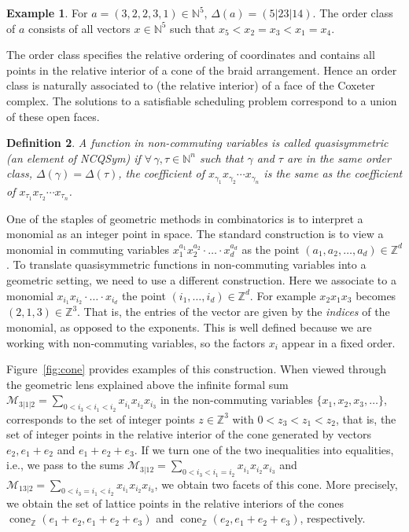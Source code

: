 \documentclass[12pt,reqno]{amsart}
\newtheorem{definition}{Definition}
\numberwithin{definition}{section}
\theoremstyle{definition}
\newtheorem{example}[definition]{Example}
\newcommand{\ZZ}{\mathbb{Z}}
\newcommand{\cone}{\operatorname{cone}}
\newcommand{\ncM}{\mathcal{M}}
\begin{document}
\begin{example}
For $a = (3,2,2,3,1) \in \mathbb{N}^5$, $\Delta(a) =
(5|23|14)$.  The order class of $a$ consists of all vectors $x
\in \mathbb{N}^5$ such that $x_5 < x_2 = x_3 < x_1 = x_4$. 
\end{example}


The order class specifies the relative ordering of coordinates and contains all points in the relative interior of a cone
of the braid arrangement.  Hence an order class is naturally associated to (the relative interior) of a face of
the Coxeter complex.  
The solutions to a satisfiable scheduling problem correspond to a union of these open faces.   


\begin{definition}
A function in non-commuting variables is called quasisymmetric (an element of NCQSym) if
$\forall \, \gamma, \tau \in \mathbb{N}^n$ such that $\gamma$ and $\tau$
are in the same order class, $\Delta(\gamma) =
\Delta(\tau)$, the coefficient of $x_{\gamma_1}x_{\gamma_2} \cdots
x_{\gamma_n}$ is the same as the coefficient of $x_{\tau_1}x_{\tau_2} \cdots x_{\tau_n}$.
\end{definition}
 One of the staples of geometric methods in combinatorics is to
 interpret a monomial as an integer point in space. The standard
 construction is to view a monomial in commuting variables
 $x_1^{a_1}x_2^{a_2}\cdot\ldots\cdot x_d^{a_d}$ as the point
 $(a_1,a_2,\ldots,a_d)\in\ZZ^d$. To translate quasisymmetric functions
 in non-commuting variables into a geometric setting, we need to use a
 different construction. Here we associate to a monomial
 $x_{i_1} x_{i_2} \cdot \ldots \cdot x_{i_d}$ the point
 $(i_1,\ldots,i_d)\in \ZZ^d$. For example $x_2x_1x_3$ becomes
 $(2,1,3)\in\ZZ^3$. That is, the entries of the vector are given by
 the \emph{indices} of the monomial, as opposed to the exponents. This
 is well defined because we are working with non-commuting variables, so
  the factors $x_i$ appear in a fixed order.

Figure~\ref{fig:cone} provides examples of this construction.  When viewed
through the geometric lens explained above the infinite formal sum
$\ncM_{3|1|2} = \sum_{0<i_3<i_1<i_2} x_{i_1}x_{i_2}x_{i_3}$ in the non-commuting
variables $\{x_1,x_2,x_3,\ldots\}$, corresponds to the set of integer
points $z\in\ZZ^3$ with $0<z_3<z_1<z_2$, that is, the set of integer
points in the relative interior of the cone generated by vectors
$e_2,e_1+e_2$ and $e_1+e_2+e_3$. If we turn one of the two
inequalities into equalities, i.e., we pass to the sums
$\ncM_{3|12} = \sum_{0<i_3<i_1 = i_2} x_{i_1}x_{i_2}x_{i_3}$ and
$\ncM_{13|2} = \sum_{0<i_3=i_1<i_2} x_{i_1}x_{i_2}x_{i_3}$, we obtain two facets of
this cone. More precisely, we obtain the set of lattice points in the
relative interiors of the cones $\cone_\ZZ(e_1+e_2,e_1+e_2+e_3)$ and
$\cone_\ZZ(e_2,e_1+e_2+e_3)$, respectively.
\end{document}

